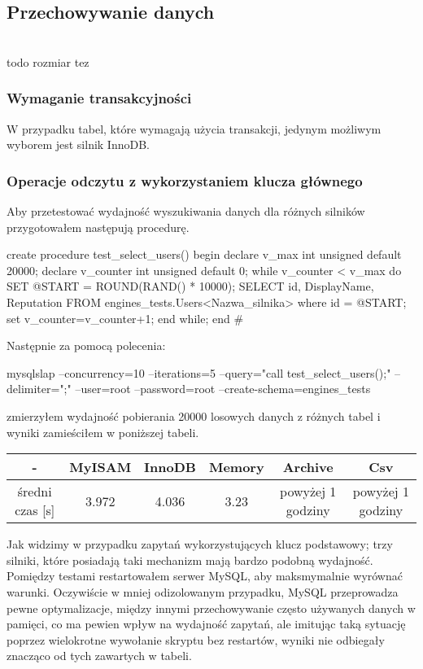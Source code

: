\subsection{Przechowywanie danych}
\\todo rozmiar tez

\subsubsection{Wymaganie transakcyjności}
W przypadku tabel, które wymagają użycia transakcji, jedynym możliwym wyborem jest silnik InnoDB.
\subsubsection{Operacje odczytu z wykorzystaniem klucza głównego}
Aby przetestować wydajność wyszukiwania danych dla różnych silników przygotowałem następują procedurę.
\begin{spverbatim}
	create procedure test_select_users()
	begin
	declare v_max int unsigned default 20000;
	declare v_counter int unsigned default 0;
	while v_counter < v_max do
		SET @START = ROUND(RAND() * 10000);
		SELECT id, DisplayName, Reputation FROM engines_tests.Users<Nazwa_silnika> where id = @START;
		set v_counter=v_counter+1;
	end while;
	end #
\end{spverbatim}

Następnie za pomocą polecenia: \begin{spverbatim}
	mysqlslap --concurrency=10 --iterations=5 --query="call test_select_users();" --delimiter=";" --user=root --password=root --create-schema=engines_tests
\end{spverbatim} zmierzyłem wydajność pobierania 20000 losowych danych z różnych tabel i wyniki zamieściłem w poniższej tabeli.

\begin{center}
	\begin{tabular}{ | c | c | c | c | c | c |}
		\hline
		- & MyISAM & InnoDB & Memory & Archive & Csv  \\ 
		\hline
		średni czas [s] & 3.972 & 4.036 & 3.23 & powyżej 1 godziny & powyżej 1 godziny \\
		\hline
	\end{tabular}
\end{center}
Jak widzimy w przypadku zapytań wykorzystujących klucz podstawowy; trzy silniki, które posiadają taki mechanizm mają bardzo podobną wydajność. Pomiędzy testami restartowałem serwer MySQL, aby maksmymalnie wyrównać warunki. Oczywiście w mniej odizolowanym przypadku, MySQL przeprowadza pewne optymalizacje, między innymi przechowywanie często używanych danych w pamięci, co ma pewien wpływ na wydajność zapytań, ale imitując taką sytuację poprzez wielokrotne wywołanie skryptu bez restartów, wyniki nie odbiegały znacząco od tych zawartych w tabeli.

